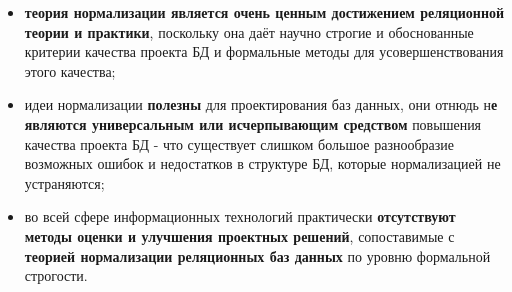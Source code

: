 \documentclass{beamer}
\begin{document}
\begin{frame}
\begin{itemize}
\item \textbf{теория нормализации является очень ценным достижением реляционной теории и практики}, поскольку она даёт научно строгие и обоснованные критерии качества проекта БД и формальные методы для усовершенствования этого качества;
\item идеи нормализации \textbf{полезны} для проектирования баз данных, они отнюдь н\textbf{е являются универсальным или исчерпывающим средством} повышения качества проекта БД - что существует слишком большое разнообразие возможных ошибок и недостатков в структуре БД, которые нормализацией не устраняются;
\item во всей сфере информационных технологий практически \textbf{отсутствуют методы оценки и улучшения проектных решений}, сопоставимые с \textbf{теорией нормализации реляционных баз данных} по уровню формальной строгости.
\end{itemize}
\end{frame} 
\end{document}
